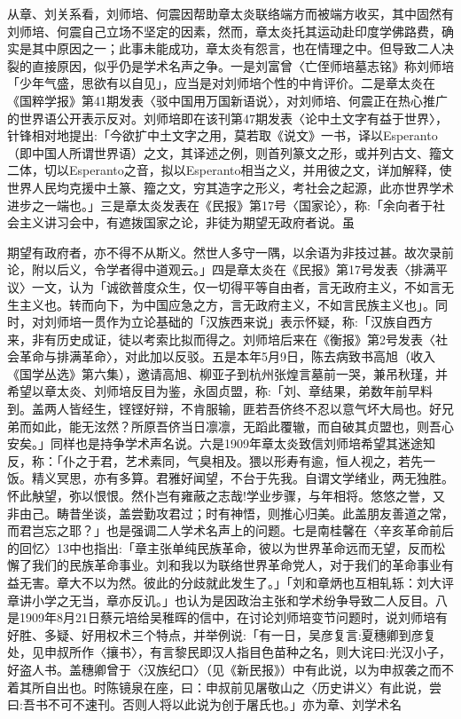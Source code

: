 从章、刘关系看，刘师培、何震因帮助章太炎联络端方而被端方收买，其中固然有刘师培、何震自己立场不坚定的因素，然而，章太炎托其运动赴印度学佛路费，确实是其中原因之一；此事未能成功，章太炎有怨言，也在情理之中。但导致二人决裂的直接原因，似乎仍是学术名声之争。一是刘富曾〈亡侄师培墓志铭》称刘师培「少年气盛，思欲有以自见」，应当是对刘师培个性的中肯评价。二是章太炎在《国粹学报》第41期发表〈驳中国用万国新语说〉，对刘师培、何震正在热心推广的世界语公开表示反对。刘师培即在该刊第47期发表〈论中土文字有益于世界〉，针锋相对地提出:「今欲扩中土文字之用，莫若取《说文》一书，译以Esperanto（即中国人所谓世界语）之文，其译述之例，则首列篆文之形，或并列古文、籀文二体，切以Esperanto之音，拟以Esperanto相当之义，并用彼之文，详加解释，使世界人民均克援中土篆、籀之文，穷其造字之形义，考社会之起源，此亦世界学术进步之一端也。」三是章太炎发表在《民报》第17号〈国家论〉，称:「余向者于社会主义讲习会中，有遮拨国家之论，非徒为期望无政府者说。虽

\vfill
\begin{BookNotes}
\end{BookNotes}

\noindent 期望有政府者，亦不得不从斯义。然世人多守一隅，以余语为非技过甚。故次录前论，附以后义，令学者得中道观云。」四是章太炎在《民报》第17号发表〈排满平议〉一文，认为「诚欲普度众生，仅一切得平等自由者，言无政府主义，不如言无生主义也。转而向下，为中国应急之方，言无政府主义，不如言民族主义也」。同时，对刘师培一贯作为立论基础的「汉族西来说」表示怀疑，称:「汉族自西方来，非有历史成证，徒以考索比拟而得之。刘师培后来在《衡报》第2号发表〈社会革命与排满革命〉，对此加以反驳。五是本年5月9日，陈去病致书高旭（收入《国学丛选》第六集），邀请高旭、柳亚子到杭州张煌言墓前一哭，兼吊秋瑾，并希望以章太炎、刘师培反目为鉴，永固贞盟，称:「刘、章结果，弟数年前早料到。盖两人皆经生，铿铿好辩，不肯服输，匪若吾侪终不忍以意气坏大局也。好兄弟而如此，能无泫然？所原吾侪当日凛凛，无蹈此覆辙，而自破其贞盟也，则吾心安矣。」同样也是持争学术声名说。六是1909年章太炎致信刘师培希望其迷途知反，称：「仆之于君，艺术素同，气臭相及。猥以形寿有逾，恒人视之，若先一饭。精义冥思，亦有多算。君雅好闻望，不台于先我。自谓文学绪业，两无独胜。怀此觖望，弥以恨恨。然仆岂有雍蔽之志哉!学业步骤，与年相将。悠悠之誉，又非由己。畴昔坐谈，盖尝勤攻君过；时有神悟，则推心归美。此盖朋友善道之常，而君岂忘之耶？」也是强调二人学术名声上的问题。七是南桂馨在〈辛亥革命前后的回忆〉13中也指出:「章主张单纯民族革命，彼以为世界革命远而无望，反而松懈了我们的民族革命事业。刘和我以为联络世界革命党人，对于我们的革命事业有益无害。章大不以为然。彼此的分歧就此发生了。」「刘和章炳也互相轧轹：刘大评章讲小学之无当，章亦反讥。」也认为是因政治主张和学术纷争导致二人反目。八是1909年8月21日蔡元培给吴稚晖的信中，在讨论刘师培变节问题时，说刘师培有好胜、多疑、好用权术三个特点，并举例说:「有一日，吴彦复言:夏穗卿到彦复处，见申叔所作〈攘书〉，有言黎民即汉人指目色苗种之名，则大诧曰:光汉小子，好盗人书。盖穗卿曾于〈汉族纪口〉（见《新民报》）中有此说，以为申叔袭之而不着其所自出也。时陈镜泉在座，曰：申叔前见屠敬山之〈历史讲义〉有此说，尝曰:吾书不可不速刊。否则人将以此说为创于屠氏也。」亦为章、刘学术名

